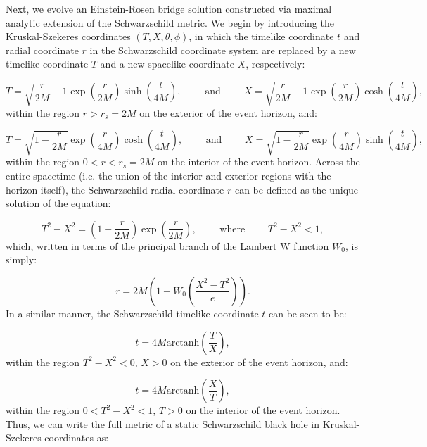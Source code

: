 \documentclass{article}
\begin{document}
Next, we evolve an Einstein-Rosen bridge solution constructed via maximal analytic extension of the Schwarzschild metric. We begin by introducing the Kruskal-Szekeres coordinates ${\left( T, X, \theta, \phi \right)}$\cite{szekeres}\cite{kruskal}, in which the timelike coordinate $t$ and radial coordinate $r$ in the Schwarzschild coordinate system are replaced by a new timelike coordinate $T$ and a new spacelike coordinate $X$, respectively:

\begin{equation}
T = \sqrt{\frac{r}{2M} - 1} \exp \left( \frac{r}{2M} \right) \sinh \left( \frac{t}{4M} \right), \qquad \text{ and } \qquad X = \sqrt{\frac{r}{2M} - 1} \exp \left( \frac{r}{2M} \right) \cosh \left( \frac{t}{4M} \right),
\end{equation}
within the region ${r > r_s = 2M}$ on the exterior of the event horizon, and:

\begin{equation}
T = \sqrt{1 - \frac{r}{2M}} \exp \left( \frac{r}{4M} \right) \cosh \left( \frac{t}{4M} \right), \qquad \text{ and } \qquad X = \sqrt{1 - \frac{r}{2M}} \exp \left( \frac{r}{4M} \right) \sinh \left( \frac{t}{4M} \right),
\end{equation}
within the region ${0 < r < r_s = 2M}$ on the interior of the event horizon. Across the entire spacetime (i.e. the union of the interior and exterior regions with the horizon itself), the Schwarzschild radial coordinate $r$ can be defined as the unique solution of the equation:

\begin{equation}
T^2 - X^2 = \left( 1- \frac{r}{2M} \right) \exp \left( \frac{r}{2M} \right), \qquad \text{ where } \qquad T^2 - X^2 < 1,
\end{equation}
which, written in terms of the principal branch of the Lambert W function ${W_0}$, is simply:

\begin{equation}
r = 2M \left( 1 + W_0 \left( \frac{X^2 - T^2}{e} \right) \right).
\end{equation}
In a similar manner, the Schwarzschild timelike coordinate $t$ can be seen to be:

\begin{equation}
t = 4M \mathrm{arctanh} \left( \frac{T}{X} \right),
\end{equation}
within the region ${T^2 - X^2 < 0}$, ${X > 0}$ on the exterior of the event horizon, and:

\begin{equation}
t = 4M \mathrm{arctanh} \left( \frac{X}{T} \right),
\end{equation}
within the region ${0 < T^2 - X^2 < 1}$, ${T > 0}$ on the interior of the event horizon. Thus, we can write the full metric of a static Schwarzschild black hole in Kruskal-Szekeres coordinates as:
\end{document}
